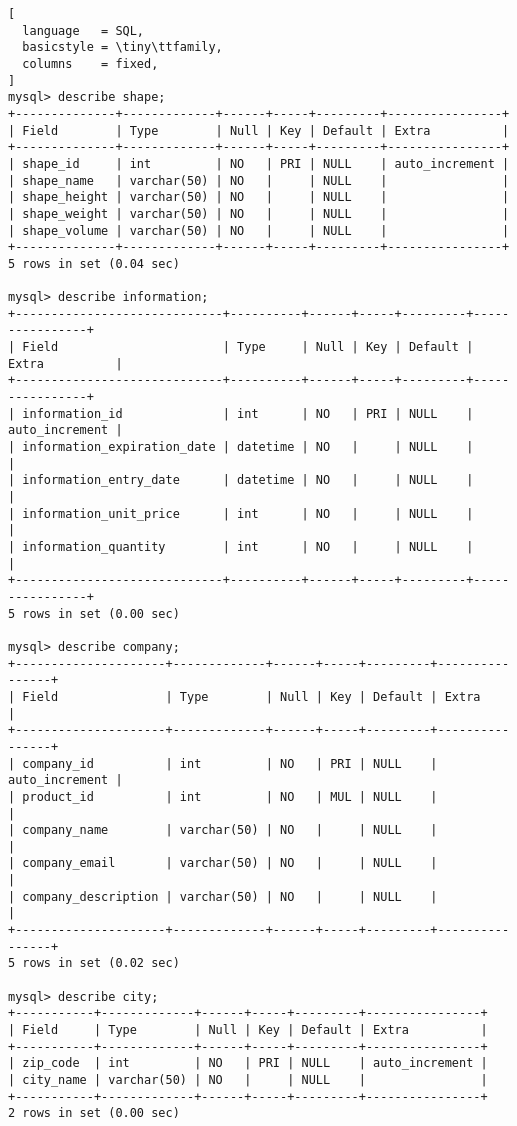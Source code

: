 \begin{landscape}
\begin{lstlisting}[
  language   = SQL,
  basicstyle = \tiny\ttfamily,
  columns    = fixed,
]
mysql> describe shape;
+--------------+-------------+------+-----+---------+----------------+
| Field        | Type        | Null | Key | Default | Extra          |
+--------------+-------------+------+-----+---------+----------------+
| shape_id     | int         | NO   | PRI | NULL    | auto_increment |
| shape_name   | varchar(50) | NO   |     | NULL    |                |
| shape_height | varchar(50) | NO   |     | NULL    |                |
| shape_weight | varchar(50) | NO   |     | NULL    |                |
| shape_volume | varchar(50) | NO   |     | NULL    |                |
+--------------+-------------+------+-----+---------+----------------+
5 rows in set (0.04 sec)

mysql> describe information;
+-----------------------------+----------+------+-----+---------+----------------+
| Field                       | Type     | Null | Key | Default | Extra          |
+-----------------------------+----------+------+-----+---------+----------------+
| information_id              | int      | NO   | PRI | NULL    | auto_increment |
| information_expiration_date | datetime | NO   |     | NULL    |                |
| information_entry_date      | datetime | NO   |     | NULL    |                |
| information_unit_price      | int      | NO   |     | NULL    |                |
| information_quantity        | int      | NO   |     | NULL    |                |
+-----------------------------+----------+------+-----+---------+----------------+
5 rows in set (0.00 sec)

mysql> describe company;
+---------------------+-------------+------+-----+---------+----------------+
| Field               | Type        | Null | Key | Default | Extra          |
+---------------------+-------------+------+-----+---------+----------------+
| company_id          | int         | NO   | PRI | NULL    | auto_increment |
| product_id          | int         | NO   | MUL | NULL    |                |
| company_name        | varchar(50) | NO   |     | NULL    |                |
| company_email       | varchar(50) | NO   |     | NULL    |                |
| company_description | varchar(50) | NO   |     | NULL    |                |
+---------------------+-------------+------+-----+---------+----------------+
5 rows in set (0.02 sec)

mysql> describe city;
+-----------+-------------+------+-----+---------+----------------+
| Field     | Type        | Null | Key | Default | Extra          |
+-----------+-------------+------+-----+---------+----------------+
| zip_code  | int         | NO   | PRI | NULL    | auto_increment |
| city_name | varchar(50) | NO   |     | NULL    |                |
+-----------+-------------+------+-----+---------+----------------+
2 rows in set (0.00 sec)


\end{lstlisting}
\end{landscape}
